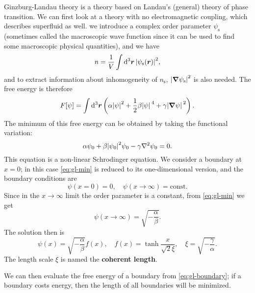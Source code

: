 \documentclass[hyperref, a4paper]{article}
\newcommand*{\const}{\mathrm{const}}
\newcommand*{\concept}[1]{{\textbf{#1}}}
\begin{document}
Ginzburg-Landau theory is a theory based on Landau's (general) theory of phase transition.
We can first look at a theory with no electromagnetic coupling,
which describes superfluid as well. 
we introduce a complex order parameter $\psi_{\text{s}}$ 
(sometimes called the macroscopic wave function 
since it can be used to find some macroscopic physical quantities),
and we have 
\begin{equation}
    n = \frac{1}{V} \int \dd[3]{\vb*{r}} \abs{\psi_{\text{s}}(\vb*{r})}^2,
\end{equation}
and to extract information about inhomogeneity of $n_{\text{s}}$, 
$\abs{\grad{\psi_{\text{s}}}}^2$ is also needed.
The free energy is therefore 
\begin{equation}
    F[\psi] = \int \dd[3]{\vb*{r}} \left(
        \alpha \abs{\psi}^2 + \frac{1}{2} \beta \abs*{\psi}^4 + \gamma \abs*{\grad{\psi}}^2
    \right).
\end{equation}
The minimum of this free energy can be obtained by taking the functional variation:
\begin{equation}
    \alpha \psi_0 + \beta \abs{\psi_0}^2 \psi_0 - \gamma \laplacian{\psi_0} = 0.
    \label{eq:gl-min}
\end{equation}
This equation is a non-linear Schrodinger equation.
We consider a boundary at $x = 0$;
in this case \eqref{eq:gl-min} is reduced to its one-dimensional version,
and the boundary conditions are 
\begin{equation}
    \psi(x = 0) = 0, \quad 
    \psi(x \to \infty) = \const.
\end{equation}
Since in the $x \to \infty$ limit the order parameter is a constant, 
from \eqref{eq:gl-min} we get 
\begin{equation}
    \psi(x \to \infty) = \sqrt{- \frac{\alpha}{\beta}}.
\end{equation}
The solution then is 
\begin{equation}
    \psi(x) = \sqrt{- \frac{\alpha}{\beta}} f(x), \quad 
    f(x) = \tanh \frac{x}{\sqrt{2} \xi}, \quad 
    \xi = \sqrt{- \frac{\gamma}{\alpha}}.
    \label{eq:gl-boundary}
\end{equation}
The length scale $\xi$ is named the \concept{coherent length}.

We can then evaluate the free energy of a boundary 
from \eqref{eq:gl-boundary};
if a boundary costs energy, 
then the length of all boundaries will be minimized.
\end{document}

